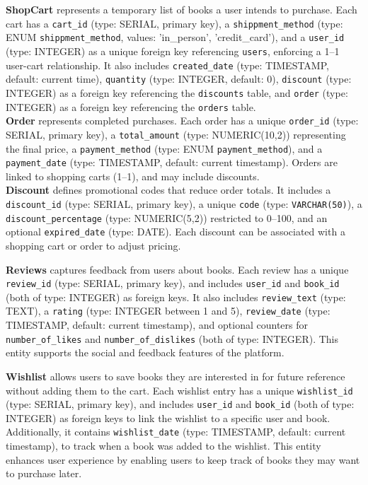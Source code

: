 \textbf{ShopCart} represents a temporary list of books a user intends to purchase. Each cart has a \texttt{cart\_id} (type: SERIAL, primary key), a \texttt{shippment\_method} (type: ENUM \texttt{shippment\_method}, values: 'in\_person', 'credit\_card'), and a \texttt{user\_id} (type: INTEGER) as a unique foreign key referencing \texttt{users}, enforcing a 1–1 user-cart relationship. It also includes \texttt{created\_date} (type: TIMESTAMP, default: current time), \texttt{quantity} (type: INTEGER, default: 0), \texttt{discount} (type: INTEGER) as a foreign key referencing the \texttt{discounts} table, and \texttt{order} (type: INTEGER) as a foreign key referencing the \texttt{orders} table.\\

\textbf{Order} represents completed purchases. Each order has a unique \texttt{order\_id} (type: SERIAL, primary key), a \texttt{total\_amount} (type: NUMERIC(10,2)) representing the final price, a \texttt{payment\_method} (type: ENUM \texttt{payment\_method}), and a \texttt{payment\_date} (type: TIMESTAMP, default: current timestamp). Orders are linked to shopping carts (1–1), and may include discounts.\\

\textbf{Discount} defines promotional codes that reduce order totals. It includes a \texttt{discount\_id} (type: SERIAL, primary key), a unique \texttt{code} (type: \texttt{VARCHAR(50)}), a \texttt{discount\_percentage} (type: NUMERIC(5,2)) restricted to 0–100, and an optional \texttt{expired\_date} (type: DATE). Each discount can be associated with a shopping cart or order to adjust pricing.

\textbf{Reviews} captures feedback from users about books. Each review has a unique \texttt{review\_id} (type: SERIAL, primary key), and includes \texttt{user\_id} and \texttt{book\_id} (both of type: INTEGER) as foreign keys. It also includes \texttt{review\_text} (type: TEXT), a \texttt{rating} (type: INTEGER between 1 and 5), \texttt{review\_date} (type: TIMESTAMP, default: current timestamp), and optional counters for \texttt{number\_of\_likes} and \texttt{number\_of\_dislikes} (both of type: INTEGER). This entity supports the social and feedback features of the platform.

\textbf{Wishlist} allows users to save books they are interested in for future reference without adding them to the cart. Each wishlist entry has a unique \texttt{wishlist\_id} (type: SERIAL, primary key), and includes \texttt{user\_id} and \texttt{book\_id} (both of type: INTEGER) as foreign keys to link the wishlist to a specific user and book. Additionally, it contains \texttt{wishlist\_date} (type: TIMESTAMP, default: current timestamp), to track when a book was added to the wishlist. This entity enhances user experience by enabling users to keep track of books they may want to purchase later.